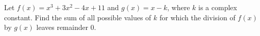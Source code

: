 Let $f(x)=x^3+3x^2-4x+11$ and $g(x)=x-k$, where $k$ is a complex constant. Find the sum of all possible values of $k$ for which the division of $f(x)$ by $g(x)$ leaves remainder $0$.

